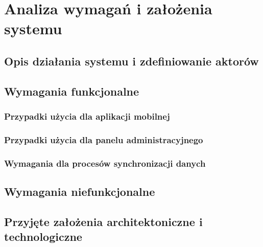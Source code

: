 \chapter{Analiza wymagań i założenia systemu}

\section{Opis działania systemu i zdefiniowanie aktorów}
\sectionanchor

\section{Wymagania funkcjonalne}
\sectionanchor

\subsection{Przypadki użycia dla aplikacji mobilnej}
\sectionanchor

\subsection{Przypadki użycia dla panelu administracyjnego}
\sectionanchor

\subsection{Wymagania dla procesów synchronizacji danych}
\sectionanchor

\section{Wymagania niefunkcjonalne}
\sectionanchor

\section{Przyjęte założenia architektoniczne i technologiczne}
\sectionanchor
